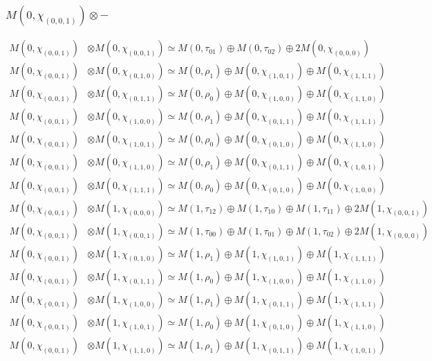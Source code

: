 \subsubsection{$ M(0,\chi_{(0,0,1)})\otimes -$}
\begin{align*}
M(0,\chi_{(0,0,1)}) &\otimes M(0,\chi_{(0,0,1)}) \simeq M(0,\tau_{01}) \oplus M(0,\tau_{02}) \oplus 2 M(0,\chi_{(0,0,0)}) \\
M(0,\chi_{(0,0,1)}) &\otimes M(0,\chi_{(0,1,0)}) \simeq M(0,\rho_{1}) \oplus M(0,\chi_{(1,0,1)}) \oplus M(0,\chi_{(1,1,1)}) \\
M(0,\chi_{(0,0,1)}) &\otimes M(0,\chi_{(0,1,1)}) \simeq M(0,\rho_{0}) \oplus M(0,\chi_{(1,0,0)}) \oplus M(0,\chi_{(1,1,0)}) \\
M(0,\chi_{(0,0,1)}) &\otimes M(0,\chi_{(1,0,0)}) \simeq M(0,\rho_{1}) \oplus M(0,\chi_{(0,1,1)}) \oplus M(0,\chi_{(1,1,1)}) \\
M(0,\chi_{(0,0,1)}) &\otimes M(0,\chi_{(1,0,1)}) \simeq M(0,\rho_{0}) \oplus M(0,\chi_{(0,1,0)}) \oplus M(0,\chi_{(1,1,0)}) \\
M(0,\chi_{(0,0,1)}) &\otimes M(0,\chi_{(1,1,0)}) \simeq M(0,\rho_{1}) \oplus M(0,\chi_{(0,1,1)}) \oplus M(0,\chi_{(1,0,1)}) \\
M(0,\chi_{(0,0,1)}) &\otimes M(0,\chi_{(1,1,1)}) \simeq M(0,\rho_{0}) \oplus M(0,\chi_{(0,1,0)}) \oplus M(0,\chi_{(1,0,0)}) \\
M(0,\chi_{(0,0,1)}) &\otimes M(1,\chi_{(0,0,0)}) \simeq M(1,\tau_{12}) \oplus M(1,\tau_{10}) \oplus M(1,\tau_{11}) \oplus 2 M(1,\chi_{(0,0,1)}) \\
M(0,\chi_{(0,0,1)}) &\otimes M(1,\chi_{(0,0,1)}) \simeq M(1,\tau_{00}) \oplus M(1,\tau_{01}) \oplus M(1,\tau_{02}) \oplus 2 M(1,\chi_{(0,0,0)}) \\
M(0,\chi_{(0,0,1)}) &\otimes M(1,\chi_{(0,1,0)}) \simeq M(1,\rho_{1}) \oplus M(1,\chi_{(1,0,1)}) \oplus M(1,\chi_{(1,1,1)}) \\
M(0,\chi_{(0,0,1)}) &\otimes M(1,\chi_{(0,1,1)}) \simeq M(1,\rho_{0}) \oplus M(1,\chi_{(1,0,0)}) \oplus M(1,\chi_{(1,1,0)}) \\
M(0,\chi_{(0,0,1)}) &\otimes M(1,\chi_{(1,0,0)}) \simeq M(1,\rho_{1}) \oplus M(1,\chi_{(0,1,1)}) \oplus M(1,\chi_{(1,1,1)}) \\
M(0,\chi_{(0,0,1)}) &\otimes M(1,\chi_{(1,0,1)}) \simeq M(1,\rho_{0}) \oplus M(1,\chi_{(0,1,0)}) \oplus M(1,\chi_{(1,1,0)}) \\
M(0,\chi_{(0,0,1)}) &\otimes M(1,\chi_{(1,1,0)}) \simeq M(1,\rho_{1}) \oplus M(1,\chi_{(0,1,1)}) \oplus M(1,\chi_{(1,0,1)}) \\

\end{align*}
